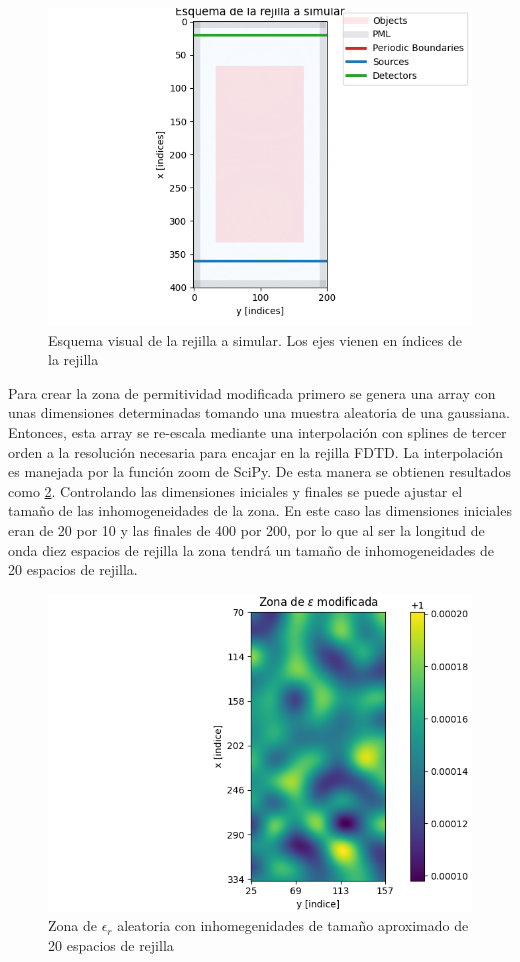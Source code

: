 \begin{figure}
    \centering
    \includegraphics[width=0.7\linewidth]{figures/setup_2d_1.png}
    \caption{Esquema visual de la rejilla a simular. Los ejes vienen en índices de la rejilla}
    \label{fig:setup1}
\end{figure}

Para crear la zona de permitividad modificada primero se genera una array con unas dimensiones determinadas tomando una muestra aleatoria de una gaussiana. Entonces, esta array se re-escala mediante una interpolación con splines de tercer orden a la resolución necesaria para encajar en la rejilla FDTD. La interpolación es manejada por la función zoom de SciPy. De esta manera se obtienen resultados como \ref{fig:perm_aleatoria}. Controlando las dimensiones iniciales y finales se puede ajustar el tamaño de las inhomogeneidades de la zona. En este caso las dimensiones iniciales eran de 20 por 10 y las finales de 400 por 200, por lo que al ser la longitud de onda diez espacios de rejilla la zona tendrá un tamaño de inhomogeneidades de 20 espacios de rejilla. 

\begin{figure}
    \centering
    \includegraphics[width=0.7\linewidth]{figures/perm_aletoria.png}
    \caption{Zona de $\epsilon_r$ aleatoria con inhomegenidades de tamaño aproximado de 20 espacios de rejilla}
    \label{fig:perm_aleatoria}
\end{figure}

